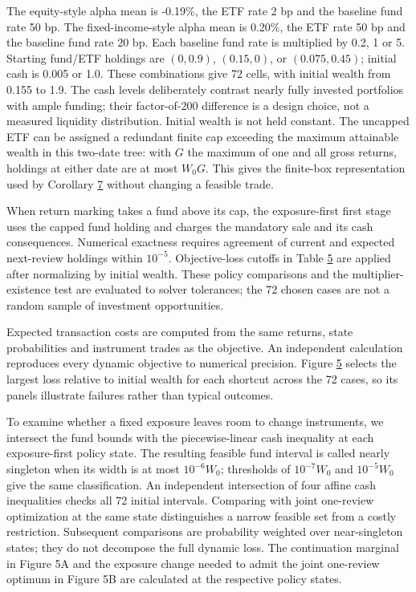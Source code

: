 \documentclass[11pt]{article}
\begin{document}
The equity-style alpha mean is -0.19\%,  the ETF rate 2 bp and the baseline fund rate 50 bp. The fixed-income-style alpha mean is 0.20\%,  the ETF rate 50 bp and the baseline fund rate 20 bp. Each baseline fund rate is multiplied by 0.2, 1 or 5. Starting fund/ETF holdings are \((0,0.9)\), \((0.15,0)\), or \((0.075,0.45)\); initial cash is 0.005 or 1.0. These combinations give 72 cells, with initial wealth from 0.155 to 1.9. The cash levels deliberately contrast nearly fully invested portfolios with ample funding; their factor-of-200 difference is a design choice, not a measured liquidity distribution. Initial wealth is not held constant. The uncapped ETF can be assigned a redundant finite cap exceeding the maximum attainable wealth in this two-date tree: with \(G\) the maximum of one and all gross returns, holdings at either date are at most \(W_0G\). This gives the finite-box representation used by Corollary \hyperref[res:Corollary-7]{7} without changing a feasible trade.

When return marking takes a fund above its cap, the exposure-first first stage uses the capped fund holding and charges the mandatory sale and its cash consequences. Numerical exactness requires agreement of current and expected next-review holdings within \(10^{-5}\). Objective-loss cutoffs in Table \hyperref[tab:5]{5} are applied after normalizing by initial wealth. These policy comparisons and the multiplier-existence test are evaluated to solver tolerances; the 72 chosen cases are not a random sample of investment opportunities.

Expected transaction costs are computed from the same returns, state probabilities and instrument trades as the objective. An independent calculation reproduces every dynamic objective to numerical precision. Figure \hyperref[fig:5]{5} selects the largest loss relative to initial wealth for each shortcut across the 72 cases, so its panels illustrate failures rather than typical outcomes.

To examine whether a fixed exposure leaves room to change instruments, we intersect the fund bounds with the piecewise-linear cash inequality at each exposure-first policy state. The resulting feasible fund interval is called nearly singleton when its width is at most \(10^{-6}W_0\); thresholds of \(10^{-7}W_0\) and \(10^{-5}W_0\) give the same classification. An independent intersection of four affine cash inequalities checks all 72 initial intervals. Comparing with joint one-review optimization at the same state distinguishes a narrow feasible set from a costly restriction. Subsequent comparisons are probability weighted over near-singleton states; they do not decompose the full dynamic loss. The continuation marginal in Figure 5A and the exposure change needed to admit the joint one-review optimum in Figure 5B are calculated at the respective policy states.
\end{document}
